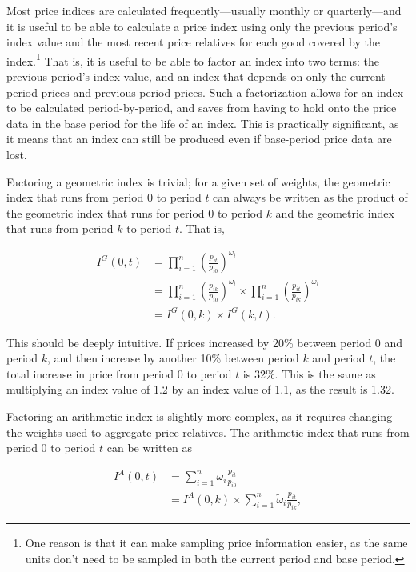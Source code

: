 \documentclass[]{article}
\begin{document}
Most price indices are calculated frequently---usually monthly or quarterly---and it is useful to be able to calculate a price index using only the previous period's index value and the most recent price relatives for each good covered by the index.\footnote{One reason is that it can make sampling price information easier, as the same units don't need to be sampled in both the current period and base period.} That is, it is useful to be able to factor an index into two terms: the previous period's index value, and an index that depends on only the current-period prices and previous-period prices. Such a factorization allows for an index to be calculated period-by-period, and saves from having to hold onto the price data in the base period for the life of an index. This is practically significant, as it means that an index can still be produced even if base-period price data are lost.

Factoring a geometric index is trivial; for a given set of weights, the geometric index that runs from period 0 to period \(t\) can always be written as the product of the geometric index that runs for period 0 to period \(k\) and the geometric index that runs from period \(k\) to period \(t\). That is,

\begin{align*}
I^{G}(0, t) &= \prod_{i = 1}^{n} \left(\frac{p_{it}}{p_{i0}}\right)^{\omega_i} \\
&= \prod_{i = 1}^{n} \left(\frac{p_{ik}}{p_{i0}}\right)^{\omega_i} \times \prod_{i = 1}^{n} \left(\frac{p_{it}}{p_{ik}}\right)^{\omega_i} \\
&= I^{G}(0, k) \times I^{G}(k, t).
\end{align*}

This should be deeply intuitive. If prices increased by 20\% between period 0 and period \(k\), and then increase by another 10\% between period \(k\) and period \(t\), the total increase in price from period 0 to period \(t\) is 32\%. This is the same as multiplying an index value of 1.2 by an index value of 1.1, as the result is 1.32.

Factoring an arithmetic index is slightly more complex, as it requires changing the weights used to aggregate price relatives. The arithmetic index that runs from period 0 to period \(t\) can be written as

\begin{align*}
I^{A}(0, t) &= \sum_{i = 1}^{n} \omega_{i} \frac{p_{it}}{p_{i0}} \\  
&= I^{A}(0, k) \times \sum_{i = 1}^{n} \tilde{\omega}_{i} \frac{p_{it}}{p_{ik}},
\end{align*}
\end{document}
